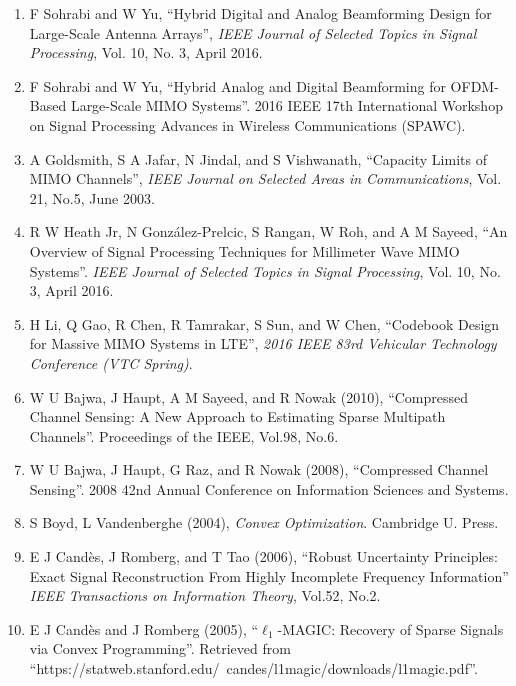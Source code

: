\documentclass[12pt]{article}
\begin{document}
\begin{enumerate}

\item F Sohrabi and W Yu, ``Hybrid Digital and Analog Beamforming Design for Large-Scale Antenna Arrays'', \textit{IEEE Journal of Selected Topics in Signal Processing}, Vol. 10, No. 3, April 2016.

\item F Sohrabi and W Yu, ``Hybrid Analog and Digital Beamforming for OFDM-Based Large-Scale MIMO Systems''. 2016 IEEE 17th International Workshop on Signal Processing Advances in Wireless Communications (SPAWC).

\item A Goldsmith, S A Jafar, N Jindal, and S Vishwanath, ``Capacity Limits of MIMO Channels'', \textit{IEEE Journal on Selected Areas in Communications}, Vol. 21, No.5, June 2003.

\item R W Heath Jr, N González-Prelcic, S Rangan, W Roh, and A M Sayeed, ``An Overview of Signal Processing Techniques for Millimeter Wave MIMO Systems''. \textit{IEEE Journal of Selected Topics in Signal Processing}, Vol. 10, No. 3, April 2016.

\item H Li, Q Gao, R Chen, R Tamrakar, S Sun, and W Chen, ``Codebook Design for Massive MIMO Systems in LTE'', \textit{2016 IEEE 83rd Vehicular Technology Conference (VTC Spring)}.

\item W U Bajwa, J Haupt, A M Sayeed, and R Nowak (2010), ``Compressed Channel Sensing: A New Approach to Estimating Sparse Multipath Channels''. Proceedings of the IEEE, Vol.98, No.6.

\item W U Bajwa, J Haupt, G Raz, and R Nowak (2008), ``Compressed Channel Sensing''. 2008 42nd Annual Conference on Information Sciences and Systems.

\item S Boyd, L Vandenberghe (2004), \textit{Convex Optimization}. Cambridge U. Press.

\item E J Cand\`es, J Romberg, and T Tao (2006), ``Robust Uncertainty Principles: Exact Signal Reconstruction From Highly Incomplete Frequency Information'' \textit{IEEE Transactions on Information Theory}, Vol.52, No.2.

\item E J Cand\`es and J Romberg (2005), ``\(\ell_1\)-MAGIC: Recovery of Sparse Signals via Convex Programming''. Retrieved from ``https://statweb.stanford.edu/~candes/l1magic/downloads/l1magic.pdf''.


\end{enumerate}
\end{document}

